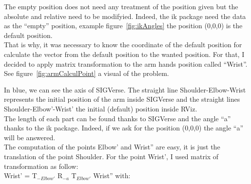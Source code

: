 The empty position does not need any treatment of the position given but the absolute and relative need to be modifyied. Indeed, the ik package need the data as the ``empty'' position, example figure~\ref{fig:ikAngles} the position (0,0,0) is the default position.\\
That is why, it was necessary to know the coordinate of the default position for calculate the vector from the default position to the wanted position. For that, I decided to apply matrix transformation to the arm hands position called ``Wrist''. See figure~\ref{fig:armCalculPoint} a visual of the problem.

\noindent\begin{minipage}{\linewidth}%
\label{fig:armCalculPoint}%
\end{minipage}

In blue, we can see the axis of SIGVerse. The straight line Shoulder-Elbow-Wrist represents the initial position of the arm inside SIGVerse and the straight lines Shoulder-Elbow'-Wrist' the initial (default) position inside RViz.\\

The length of each part can be found thanks to SIGVerse and the angle ``a'' thanks to the ik package. Indeed, if we ask for the position (0,0,0) the angle ``a'' will be answered.\\
The computation of the points Elbow' and Wrist'' are easy, it is just the translation of the point Shoulder. For the point Wrist', I used matrix of transformation as follow:\\
Wrist' = T$_{-Elbow'}$ R$_{-a}$ T$_{Elbow'}$ Wrist'' with:\\

